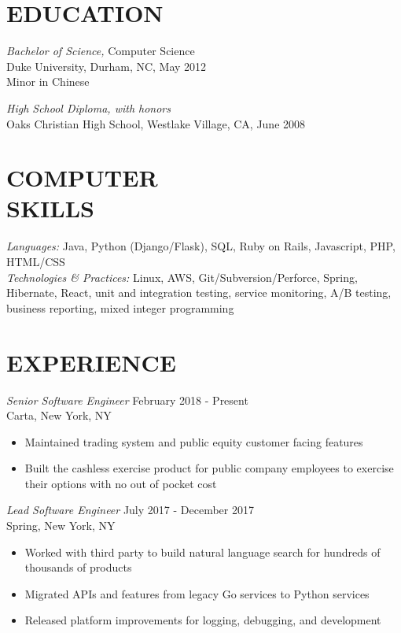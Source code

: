 \documentclass[line,margin]{res}
\begin{document}
    \setlength{\pdfpageheight}{\paperheight}
    \setlength{\pdfpagewidth}{\paperwidth}
\address{414 W. 22nd St. Apt. 17, New York, NY 10011}
\address{alex@galonsky.com}

 
\begin{resume}
\section{EDUCATION} 
    {\sl Bachelor of Science,} Computer Science \\
    Duke University, Durham, NC, 
    May 2012 \\
    Minor in Chinese

    {\sl High School Diploma, with honors} \\
    Oaks Christian High School, Westlake Village, CA, June 2008
 
\section{COMPUTER \\ SKILLS} 
    {\sl Languages:} Java, Python (Django/Flask), SQL, Ruby on Rails, Javascript, PHP, HTML/CSS \\
    {\sl Technologies \& Practices:} Linux, AWS, Git/Subversion/Perforce, Spring, Hibernate, React, unit and integration testing, service monitoring, A/B testing, business reporting, mixed integer programming
 
\section{EXPERIENCE}

    {\sl Senior Software Engineer} \hfill February 2018 - Present \\
        Carta, New York, NY
        \begin{itemize}  \itemsep -2pt %
            \item Maintained trading system and public equity customer facing features
            \item Built the cashless exercise product for public company employees to exercise their options with no out of pocket cost
        \end{itemize}

    {\sl Lead Software Engineer} \hfill July 2017 - December 2017 \\
        Spring, New York, NY
        \begin{itemize}  \itemsep -2pt %
            \item Worked with third party to build natural language search for hundreds of thousands of products
            \item Migrated APIs and features from legacy Go services to Python services
            \item Released platform improvements for logging, debugging, and development
        \end{itemize}


\end{resume}
\end{document}

